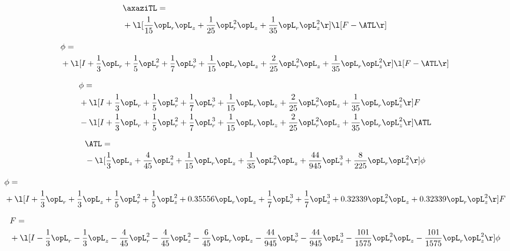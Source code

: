 \begin{alignat}{2} 
\label{eq:linaxaziTL_1} 
& \axaziTL = \\ 
& + \l[ \frac{1}{15} \opL_r \opL_z + \frac{1}{25} \opL_r^{2} \opL_z + \frac{1}{35} \opL_r \opL_z^{2}  \r] \l[ F - \ATL \r] \nonumber \\ 
\end{alignat} 


\begin{alignat}{2} 
\label{eq:scalarFlux_1} 
& \phi = \\ 
& + \l[ I + \frac{1}{3} \opL_r + \frac{1}{5} \opL_r^{2} + \frac{1}{7} \opL_r^{3} + \frac{1}{15} \opL_r \opL_z + \frac{2}{25} \opL_r^{2} \opL_z + \frac{1}{35} \opL_r \opL_z^{2}  \r] \l[ F - \ATL \r] \nonumber \\ 
\end{alignat} 


\begin{alignat}{2} 
\label{eq:scalarFlux_2} 
& \phi = \\ 
& + \l[ I + \frac{1}{3} \opL_r + \frac{1}{5} \opL_r^{2} + \frac{1}{7} \opL_r^{3} + \frac{1}{15} \opL_r \opL_z + \frac{2}{25} \opL_r^{2} \opL_z + \frac{1}{35} \opL_r \opL_z^{2}  \r] F \nonumber \\ 
& - \l[ I + \frac{1}{3} \opL_r + \frac{1}{5} \opL_r^{2} + \frac{1}{7} \opL_r^{3} + \frac{1}{15} \opL_r \opL_z + \frac{2}{25} \opL_r^{2} \opL_z + \frac{1}{35} \opL_r \opL_z^{2}  \r] \ATL \nonumber \\ 
\end{alignat} 


\begin{alignat}{2} 
\label{eq:isoATL_3} 
& \ATL = \\ 
& - \l[ \frac{1}{3} \opL_z + \frac{4}{45} \opL_z^{2} + \frac{1}{15} \opL_r \opL_z + \frac{1}{35} \opL_r^{2} \opL_z + \frac{44}{945} \opL_z^{3} + \frac{8}{225} \opL_r \opL_z^{2}  \r] \phi \nonumber \\ 
\end{alignat} 


\begin{alignat}{2} 
\label{eq:scalarFlux_3} 
& \phi = \\ 
& + \l[ I + \frac{1}{3} \opL_r + \frac{1}{3} \opL_z + \frac{1}{5} \opL_r^{2} + \frac{1}{5} \opL_z^{2} +  0.35556 \opL_r \opL_z + \frac{1}{7} \opL_r^{3} + \frac{1}{7} \opL_z^{3} +  0.32339 \opL_r^{2} \opL_z +  0.32339 \opL_r \opL_z^{2}  \r] F \nonumber \\ 
\end{alignat} 


\begin{alignat}{2} 
\label{eq:transport3D_0} 
& F = \\ 
& + \l[ I - \frac{1}{3} \opL_r - \frac{1}{3} \opL_z - \frac{4}{45} \opL_r^{2} - \frac{4}{45} \opL_z^{2} - \frac{6}{45} \opL_r \opL_z - \frac{44}{945} \opL_r^{3} - \frac{44}{945} \opL_z^{3} - \frac{101}{1575} \opL_r^{2} \opL_z - \frac{101}{1575} \opL_r \opL_z^{2}  \r] \phi \nonumber \\ 
\end{alignat} 


